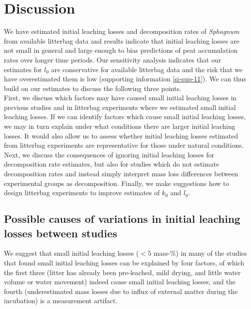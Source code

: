 \documentclass[bg, manuscript]{copernicus}
\begin{document}
\section{Discussion}

We have estimated initial leaching losses and decomposition rates of \emph{Sphagnum} from available litterbag data and results indicate that initial leaching losses are not small in general and large enough to bias predictions of peat accumulation rates over longer time periods. Our sensitivity analysis indicates that our estimates for \(l_0\) are conservative for available litterbag data and the risk that we have overestimated them is low (supporting information \ref{si-sup-11}). We can thus build on our estimates to discuss the following three points.\\
First, we discuss which factors may have caused small initial leaching losses in previous studies and in litterbag experiments where we estimated small initial leaching losses. If we can identify factors which cause small initial leaching losses, we may in turn explain under what conditions there are larger initial leaching losses. It would also allow us to assess whether initial leaching losses estimated from litterbag experiments are representative for those under natural conditions. Next, we discuss the consequences of ignoring initial leaching losses for decomposition rate estimates, but also for studies which do not estimate decomposition rates and instead simply interpret mass loss differences between experimental groups as decomposition. Finally, we make suggestions how to design litterbag experiments to improve estimates of \(k_0\) and \(l_0\).

\hypertarget{out-discussion-2}{%
\subsection{Possible causes of variations in initial leaching losses between studies}\label{out-discussion-2}}

We suggest that small initial leaching losses (\(<5\) mass-\%) in many of the studies that found small initial leaching losses can be explained by four factors, of which the first three (litter has already been pre-leached, mild drying, and little water volume or water movement) indeed cause small initial leaching losses, and the fourth (underestimated mass losses due to influx of external matter during the incubation) is a measurement artifact.
\end{document}
